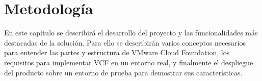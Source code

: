 \chapter{Metodología}
\label{chap:Metodologia}
En este capítulo se describirá el desarrollo del proyecto y las funcionalidades más destacadas de la solución. Para ello se describirán varios conceptos necesarios para entender las partes y estructura de VMware Cloud Foundation, los requisitos para implementar VCF en un entorno real, y finalmente el despliegue del producto sobre un entorno de prueba para demostrar sus características.

%



%
%
